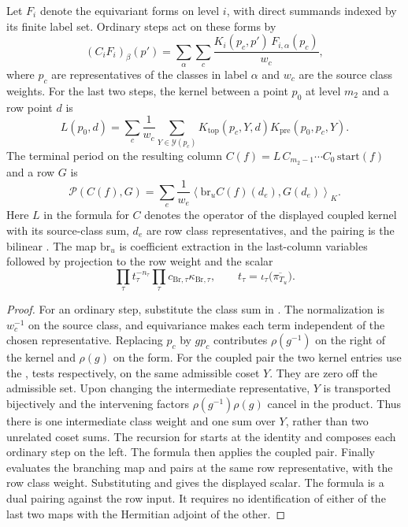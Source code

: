 \begin{proposition}\label{geo:chain-compose}
Let \(F_i\) denote the equivariant forms on level \(i\), with direct summands indexed by its finite label set. Ordinary steps act on these forms by
\[
 (C_i F_i)_\beta(p')=
       \sum_{\alpha}\sum_{c}
          \frac{K_i(p_c,p')\,F_{i,\alpha}(p_c)}{w_c},
\]
where \(p_c\) are representatives of the classes in label \(\alpha\) and \(w_c\) are the source class weights. For the last two steps, the kernel between a point \(p_0\) at level \(m_2\) and a row point \(d\) is
\[
 L(p_0,d)=\sum_c \frac1{w_c}
                \sum_{Y\in\mathcal Y(p_c)}
                   K_{\mathrm{top}}(p_c,Y,d)
                   K_{\mathrm{pre}}(p_0,p_c,Y).
\]
The terminal period on the resulting column \(C(f)=
L\,C_{m_2-1}\cdots C_0\,\mathrm{start}(f)\) and a row \(G\) is
\[
 \mathcal P(C(f),G)
       =\sum_e \frac1{w_e}
            \left\langle \mathrm{br}_u C(f)(d_e),G(d_e)\right\rangle_{K}.
\]
Here \(L\) in the formula for \(C\) denotes the operator of the displayed coupled kernel with its source-class sum, \(d_e\) are row class representatives, and the pairing is the bilinear . The map \(\mathrm{br}_u\) is coefficient extraction in the last-column variables followed by projection to the row weight and the scalar
\[
 \prod_\tau t_\tau^{-n_\tau}
        \prod_\tau c_{\mathrm{Br},\tau}\kappa_{\mathrm{Br},\tau},
 \qquad
 t_\tau=\iota_\tau\bigl(\overline{\pi_{T_u}}\bigr).
\]
\end{proposition}
\begin{proof}
For an ordinary step, substitute the class sum  in . The normalization is \(w_c^{-1}\) on the source class, and equivariance makes each term independent of the chosen representative. Replacing \(p_c\) by \(g p_c\) contributes \(\rho(g^{-1})\) on the right of the kernel and \(\rho(g)\) on the form. For the coupled pair the two kernel entries use the ,  tests respectively, on the same admissible coset \(Y\). They are zero off the admissible set. Upon changing the intermediate representative, \(Y\) is transported bijectively and the intervening factors \(\rho(g^{-1})\rho(g)\) cancel in the product. Thus there is one intermediate class weight and one sum over \(Y\), rather than two unrelated coset sums. The recursion for  starts at the identity and composes each ordinary step on the left. The  formula then applies the coupled pair. Finally  evaluates the branching map and pairs at the same row representative, with the row class weight. Substituting  and  gives the displayed scalar. The formula is a dual pairing against the row input. It requires no identification of either of the last two maps with the Hermitian adjoint of the other.
\end{proof}
